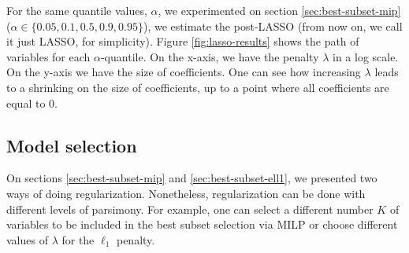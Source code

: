 For the same quantile values, $\alpha$, we experimented on section \ref{sec:best-subset-mip} ($\alpha \in \{0.05, 0.1, 0.5, 0.9, 0.95\}$), we estimate the post-LASSO (from now on, we call it just LASSO, for simplicity). Figure \ref{fig:lasso-results} shows the path of variables for each $\alpha$-quantile. On the x-axis, we have the penalty $\lambda$ in a log scale. On the y-axis we have the size of coefficients. One can see how increasing $\lambda$ leads to a shrinking on the size of coefficients, up to a point where all coefficients are equal to 0.


\subsection{Model selection}

On sections \ref{sec:best-subset-mip} and \ref{sec:best-subset-ell1}, we presented two ways of doing regularization. Nonetheless, regularization can be done with different levels of parsimony. For example, one can select a different number $K$ of variables to be included in the best subset selection via MILP or choose different values of $\lambda$ for the $\ell_1$ penalty. 

